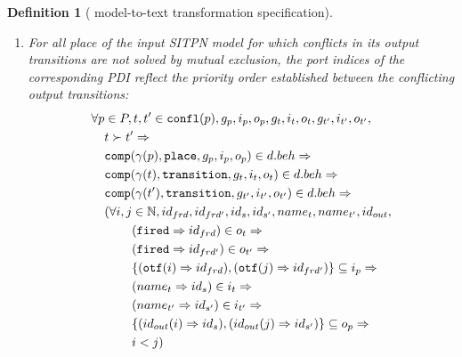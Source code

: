 \documentclass[pdflatex,sn-mathphys]{sn-jnl}%
\theoremstyle{thmstyleone}%
\theoremstyle{thmstyletwo}%
\theoremstyle{thmstylethree}%
\newtheorem{definition}{Definition}%
\begin{document}
\begin{definition}[\hilecop{} model-to-text transformation specification]
  \begin{enumerate}[resume]
  \item\label{it:port-indices-ordering} For all place of the input
    SITPN model for which conflicts in its output transitions are not
    solved by mutual exclusion, the port indices of the corresponding
    PDI reflect the priority order established between the conflicting
    output transitions:
    \begin{equation*}
      \begin{aligned}[t]
        \forall{}p&\in{}P,t,t'\in{}\mathtt{confl}(p),g_p,i_p,o_p,g_t,i_t,o_t,g_{t'},i_{t'},o_{t'}, \\
                  & t\succ{}t'\Rightarrow\\
                  & \mathtt{comp}(\gamma(p),\mathtt{place},g_p,i_p,o_p)\in{}d.beh\Rightarrow \\
                  & \mathtt{comp}(\gamma(t),\mathtt{transition},g_{t},i_{t},o_{t})\in{}d.beh\Rightarrow \\
                  & \mathtt{comp}(\gamma(t'),\mathtt{transition},g_{t'},i_{t'},o_{t'})\in{}d.beh\Rightarrow \\
                  &
                    \begin{aligned}[t]
                      (\forall{}i,j&\in\mathbb{N},id_{frd},id_{frd'},id_{s},id_{s'},name_t,name_{t'},id_{out}, \\
                                   & (\mathtt{fired}\Rightarrow{}id_{frd})\in{}o_t\Rightarrow \\
                                   & (\mathtt{fired}\Rightarrow{}id_{frd'})\in{}o_{t'}\Rightarrow \\
                                   & \{(\mathtt{otf}(i)\Rightarrow{}id_{frd}),(\mathtt{otf}(j)\Rightarrow{}id_{frd'})\}\subseteq{}i_p\Rightarrow \\
                                   & (name_t\Rightarrow{}id_{s})\in{}i_t\Rightarrow \\
                                   & (name_{t'}\Rightarrow{}id_{s'})\in{}i_{t'}\Rightarrow \\
                                   & \{(id_{out}(i)\Rightarrow{}id_s),(id_{out}(j)\Rightarrow{}id_{s'})\}\subseteq{}o_p\Rightarrow \\
                                   & i<j) \\
                    \end{aligned} \\
      \end{aligned}
    \end{equation*}
  \end{enumerate}

  \bigskip


\end{definition}
\end{document}
